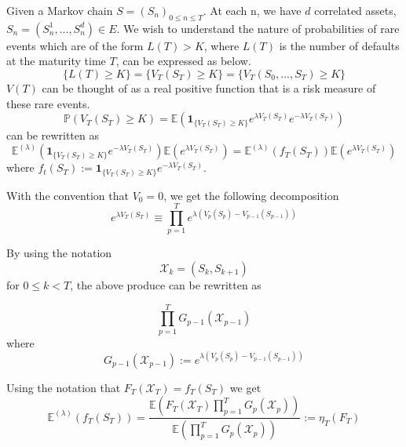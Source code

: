 \begin{frame}

Given a Markov chain $S=(S_n)_{0 \leq n \leq T}$. At each n, we have $d$ correlated assets, $S_n = (S_n^1,...,S_n^d) \in \mathit{E}$. We wish to understand the nature of probabilities of rare events which are of the form $L(T) > K$, where $L(T)$ is the number of defaults at the maturity time $T$, can be expressed as below.
$$
\{L(T) \geq K\} = \{V_T(S_T)\geq K\} = \{V_T(S_0,...,S_T)\geq K\}
$$
$V(T)$ can be thought of as a real positive function that is a risk measure of these rare events.\\

$$\mathbb{P}(V_T(S_T) \geq K) = \mathbb{E}\left( \mathbf{1}_{\{V_T(S_T) \geq K\}}e^{\lambda V_T(S_T)}e^{-\lambda V_T(S_T)} \right)$$
can be rewritten as
$$\mathbb{E}^{(\lambda)} \left(  \mathbf{1}_{\{V_T(S_T) \geq K\}} e^{-\lambda V_T(S_T)} \right) \mathbb{E} \left(e^{\lambda V_T(S_T)}\right) = 
\mathbb{E}^{(\lambda)}(f_T(S_T)) \mathbb{E}(e^{\lambda V_T(S_T)})  $$
where $f_t(S_T) := \mathbf{1}_{\{V_T(S_T) \geq K\}}e^{-\lambda V_T(S_T)} $. 
\end{frame}

\begin{frame}
With the convention that $V_0 = 0$, we get the following decomposition
$$e^{\lambda V_T(S_T)} \equiv \prod_{p=1}^{T} e^{\lambda (V_p(S_p) - V_{p-1}(S_{p-1}))}$$

By using the notation $$\mathcal{X}_k = (S_k, S_{k+1})$$ for $0 \leq k < T$, the above produce can be rewritten as

$$\prod_{p=1}^{T} G_{p-1}(\mathcal{X}_{p-1})$$ where
$$G_{p-1}(\mathcal{X}_{p-1}) := e^{\lambda (V_p(S_p) - V_{p-1}(S_{p-1}))}$$

Using the notation that $F_T(\mathcal{X}_T) = f_T(S_T)$ we get
\begin{equation}
	\mathbb{E}^{(\lambda)}(f_T(S_T)) = \frac{\mathbb{E}(F_T(\mathcal{X}_T)\prod_{p=1}^{T}G_p(\mathcal{X}_p))}{\mathbb{E}(\prod_{p=1}^{T}G_p(\mathcal{X}_p))} := \eta_T(F_T)
\end{equation}
\end{frame}